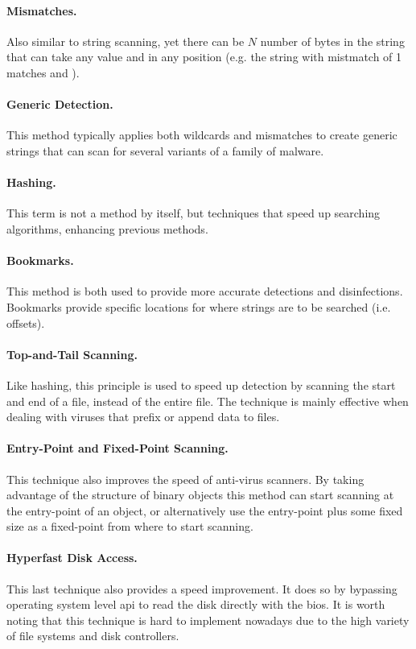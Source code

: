 \paragraph{Mismatches.} Also similar to string scanning, yet there can be $N$ number of bytes in the string that can take any value and in any position (e.g. the string  with mistmatch of 1 matches  and ).

\paragraph{Generic Detection.} This method typically applies both wildcards and mismatches to create generic strings that can scan for several variants of a family of malware.

\paragraph{Hashing.} This term is not a method by itself, but techniques that speed up searching algorithms, enhancing previous methods.

\paragraph{Bookmarks.} This method is both used to provide more accurate detections and disinfections. Bookmarks provide specific locations for where strings are to be searched (i.e. offsets).

\paragraph{Top-and-Tail Scanning.} Like hashing, this principle is used to speed up detection by scanning the start and end of a file, instead of the entire file. The technique is mainly effective when dealing with viruses that prefix or append data to files.

\paragraph{Entry-Point and Fixed-Point Scanning.} This technique also improves the speed of anti-virus scanners. By taking advantage of the structure of binary objects this method can start scanning at the entry-point of an object, or alternatively use the entry-point plus some fixed size as a fixed-point from where to start scanning.

\paragraph{Hyperfast Disk Access.} This last technique also provides a speed improvement. It does so by bypassing operating system level \gls{api} to read the disk directly with the \gls{bios}. It is worth noting that this technique is hard to implement nowadays due to the high variety of file systems and disk controllers.\\

